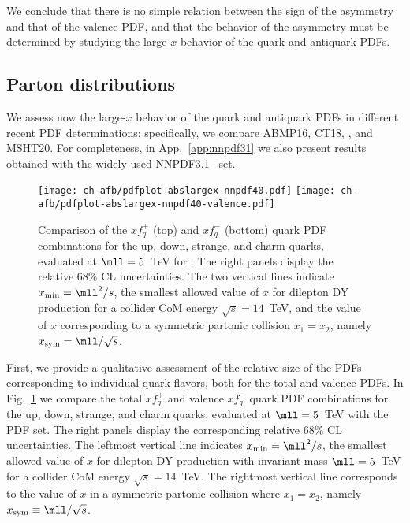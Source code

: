 We conclude that there
is no simple relation between the sign of the asymmetry and that of
the valence PDF, and that the
behavior of the asymmetry must be determined by studying the large-$x$
behavior of the quark and antiquark PDFs.

\subsection{Parton distributions}
\label{sec:subsec-largexPDFs}

We assess now the large-$x$ behavior of
the quark and antiquark PDFs in different recent PDF
determinations: specifically, we compare
 ABMP16,
 CT18,  ,
 and MSHT20.
%
 For
completeness, in App.~\ref{app:nnpdf31} we also present results
obtained with the widely used NNPDF3.1~\cite{Ball:2017nwa} set.

\begin{figure}[!t]
 \centering
 \texttt{[image: ch-afb/pdfplot-abslargex-nnpdf40.pdf]}
 \texttt{[image: ch-afb/pdfplot-abslargex-nnpdf40-valence.pdf]}
 \caption{\small Comparison of the $xf^+_q$ (top) and $xf_q^-$ (bottom) quark
   PDF combinations for the up, down, strange, and charm quarks,
   evaluated at $\mll=5$~TeV for  \nnlo.
   The right panels display the relative 68\% CL uncertainties.
   The two vertical lines indicate $x_{\rm min}=\mll^2/s$, the
   smallest allowed value of $x$ 
   for dilepton DY production for a collider
   CoM energy $\sqrt{s}=14$~TeV, and the value of $x$
   corresponding to a symmetric partonic collision $x_1=x_2$, namely
 $x_{\rm  sym}=\mll/\sqrt{s}$.
 }    
 \label{fig:pdfplot-abslargex}
\end{figure}

First, we provide a qualitative assessment of the relative size of the
PDFs corresponding to
individual quark flavors, both for the total and valence PDFs.
In Fig.~\ref{fig:pdfplot-abslargex} we
compare  the total $xf^+_q$ and valence $xf_q^-$  quark
   PDF combinations for the up, down, strange, and charm quarks,
   evaluated at $\mll=5$~TeV with the  \nnlo PDF set.
   The right panels display the corresponding relative 68\% CL uncertainties.
  The leftmost vertical line indicates $x_{\rm min}=\mll^2/s$, the
  smallest allowed value of $x$ 
   for dilepton DY production with invariant mass $\mll=5$~TeV for a collider
   CoM energy $\sqrt{s}=14$~TeV.
   The rightmost vertical line corresponds to
   the value of $x$ in a symmetric partonic collision where $x_1=x_2$, namely
   $x_{\rm  sym}\equiv\mll/\sqrt{s}$.

